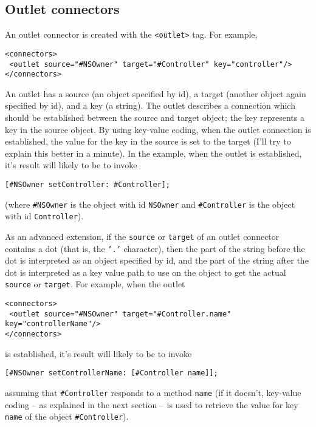 \subsection{Outlet connectors}
An outlet connector is created with the \texttt{<outlet>} tag.  For
example,
\begin{verbatim}
<connectors>
 <outlet source="#NSOwner" target="#Controller" key="controller"/>
</connectors>
\end{verbatim}
An outlet has a source (an object specified by id), a target (another
object again specified by id), and a key (a string).  The outlet
describes a connection which should be established between the source
and target object; the key represents a key in the source object.  By
using key-value coding, when the outlet connection is established, the
value for the key in the source is set to the target (I'll try to
explain this better in a minute).  In the example, when the outlet is
established, it's result will likely to be to invoke
\begin{verbatim}
[#NSOwner setController: #Controller];
\end{verbatim}
(where \texttt{\#NSOwner} is the object with id \texttt{NSOwner} and 
\texttt{\#Controller} is the object with id \texttt{Controller}).

As an advanced extension, if the \texttt{source} or \texttt{target} of
an outlet connector contains a dot (that is, the \texttt{'.'} 
character), then the part of the string before the dot is interpreted
as an object specified by id, and the part of the string after the dot
is interpreted as a key value path to use on the object to get the
actual \texttt{source} or \texttt{target}.  For example, when the outlet
\begin{verbatim}
<connectors>
 <outlet source="#NSOwner" target="#Controller.name" key="controllerName"/>
</connectors>
\end{verbatim}
is established, it's result will likely to be to invoke
\begin{verbatim}
[#NSOwner setControllerName: [#Controller name]];
\end{verbatim}
assuming that \texttt{\#Controller} responds to a method
\texttt{name} (if it doesn't, key-value coding -- as explained 
in the next section -- is used to retrieve the value for key
\texttt{name} of the object \texttt{\#Controller}).

